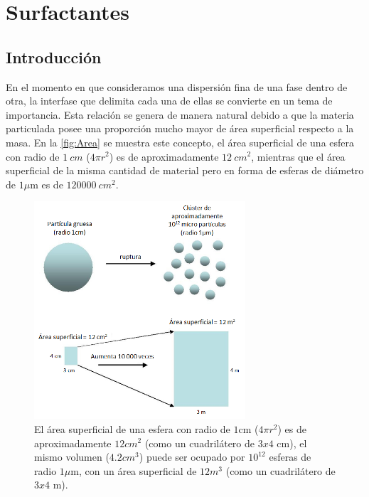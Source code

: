 \chapter{Surfactantes}
\label{chp:tensoactivos}

\section{Introducción}
En el momento en que consideramos una dispersión fina de una fase dentro de otra, la interfase que delimita cada una de ellas se convierte en un tema de importancia. Esta relación se genera de manera natural debido a que la materia particulada posee una proporción mucho mayor de área superficial respecto a la masa. En la \autoref{fig:Area} se muestra este concepto, el área superficial de una esfera con radio de $1~cm$ ($4 \pi r^{2}$) es de aproximadamente $12~cm^{2}$, mientras que el área superficial de la misma cantidad de material pero en forma de esferas de diámetro de $1\mu$m es de $120000~cm^{2}$.
\begin{figure}
    \centering
    \includegraphics[width=0.7\textwidth]{Graphics/Area.png}
    \caption[Área superficial]{El área superficial de una esfera con radio de $1$cm ($4 \pi r^{2}$) es de aproximadamente $12 cm^{2}$ (como un cuadrilátero de $3 x 4$ cm), el mismo volumen ($4.2 cm^{3}$) puede ser ocupado por $10^{12}$ esferas de radio $1 \mu$m, con un área superficial de $12m^{3}$ (como un cuadrilátero de $3 x 4$ m). }
    \label{fig:Area}
\end{figure}

